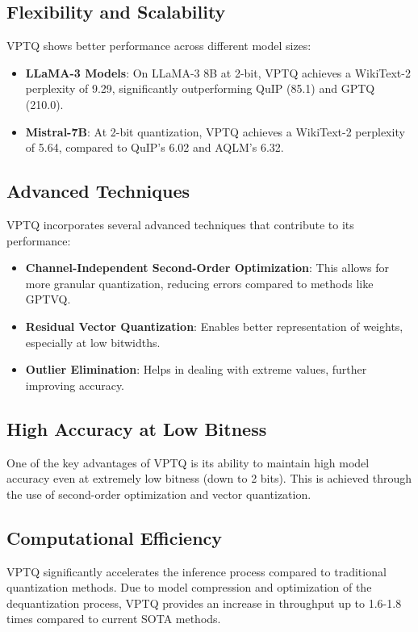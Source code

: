 \documentclass{article}
\begin{document}
\subsection{Flexibility and Scalability}
VPTQ shows better performance across different model sizes:

\begin{itemize}
    \item \textbf{LLaMA-3 Models}: On LLaMA-3 8B at 2-bit, VPTQ achieves a WikiText-2 perplexity of 9.29, significantly outperforming QuIP (85.1) and GPTQ (210.0).
    \item \textbf{Mistral-7B}: At 2-bit quantization, VPTQ achieves a WikiText-2 perplexity of 5.64, compared to QuIP's 6.02 and AQLM's 6.32.
\end{itemize}

\subsection{Advanced Techniques}
VPTQ incorporates several advanced techniques that contribute to its performance:

\begin{itemize}
    \item \textbf{Channel-Independent Second-Order Optimization}: This allows for more granular quantization, reducing errors compared to methods like GPTVQ.
    \item \textbf{Residual Vector Quantization}: Enables better representation of weights, especially at low bitwidths.
    \item \textbf{Outlier Elimination}: Helps in dealing with extreme values, further improving accuracy.
\end{itemize}

\subsection{High Accuracy at Low Bitness}
One of the key advantages of VPTQ is its ability to maintain high model accuracy even at extremely low bitness (down to 2 bits). This is achieved through the use of second-order optimization and vector quantization.

\subsection{Computational Efficiency}
VPTQ significantly accelerates the inference process compared to traditional quantization methods. Due to model compression and optimization of the dequantization process, VPTQ provides an increase in throughput up to 1.6-1.8 times compared to current SOTA methods.
\end{document}
